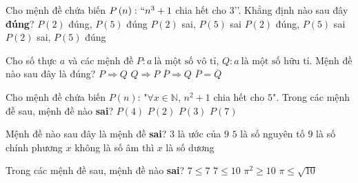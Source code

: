 \begin{ex}%
	Cho mệnh đề chứa biến $P\left(n\right)\colon \lq\lq  n^3+1 $ chia hết cho $3$\rq\rq. Khẳng định nào sau đây \textbf{đúng}?
	 \choice
		{\True$ P(2)$ đúng,  $P(5)$ đúng}
		 {$P(2)$ sai, $P(5)$ sai}
		{$P(2)$ đúng, $P(5)$  sai}
		{$P(2)$ sai, $P(5)$ đúng} 
\end{ex}

\begin{ex}%
	Cho số thực  $a$ và các mệnh đề $P\colon a\ \text{là một số vô tỉ}$, $Q\colon a\ \text{là một số hữu tỉ}$. Mệnh đề nào sau đây là đúng?
	\choice 
		{$P\Rightarrow Q$} 
		{$Q\Rightarrow  P$}
		{\True $\overline{P}\Rightarrow Q$} 
		 {$\overline{P}=\overline{Q}$}
\end{ex}

\begin{ex}%
	Cho mệnh đề chứa biến $P(n)$: "$\forall x \in \mathbb{N}$, $n^2+1$ chia hết cho $5$". Trong các mệnh  đề sau, mệnh đề nào \textbf{sai}?
	 \choice
		 {\True $P(4)$}
		{$P(2)$} 
		 {$P(3)$}
		 {$P(7)$}
\end{ex}

\begin{ex}%
	Mệnh đề nào sau đây là mệnh đề  \textbf{sai}?
	 \choice
		{$3$  là ước của $9$}
		{$5$  là số nguyên tố}
		{$9$  là số chính phương}
		{\True $x$ không là số âm thì $x$ là số  dương}
\end{ex}

\begin{ex}%
	Trong các mệnh đề sau, mệnh đề  nào \textbf{sai}?
	 \choice
		{$7  \le 7$}
		{$7 \le  10$}
		 {\True $\pi^2 \ge 10$}
		 {$\pi \le \sqrt{10}$}
\end{ex}

